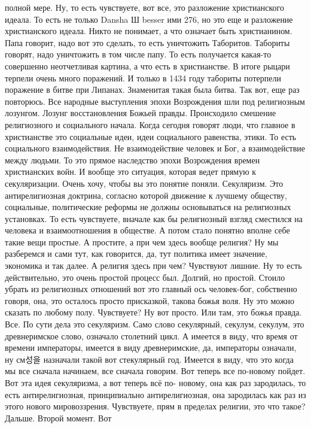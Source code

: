 полной мере. Ну, то есть чувствуете, вот все, это разложение христианского
идеала. То есть не только Dansha Ш besser ими 276, но это еще и разложение
христианского идеала. Никто не понимает, а что означает быть христианином. Папа
говорит, надо вот это сделать, то есть уничтожить Таборитов. Табориты говорят,
надо уничтожить в том числе папу. То есть получается какая-то совершенно
неотчетливая картина, а что есть в христианстве. В итоге рыцари терпели очень
много поражений. И только в 1434 году табориты потерпели поражение в битве при
Липанах. Знаменитая такая была битва. Так вот, еще раз повторюсь. Все народные
выступления эпохи Возрождения шли под религиозным лозунгом. Лозунг
восстановления Божьей правды. Происходило смешение религиозного и социального
начала. Когда сегодня говорят люди, что главное в христианстве это социальные
идеи, идеи социального равенства, этики. То есть социального взаимодействия. Не
взаимодействие человек и Бог, а взаимодействие между людьми. То это прямое
наследство эпохи Возрождения времен христианских войн. И вообще это ситуация,
которая ведет прямую к секуляризации. Очень хочу, чтобы вы это понятие поняли.
Секуляризм. Это антирелигиозная доктрина, согласно которой движение к лучшему
обществу, социальные, политические реформы не должны основываться на религиозных
установках. То есть чувствуете, вначале как бы религиозный взгляд сместился на
человека и взаимоотношения в обществе. А потом стало понятно вполне себе такие
вещи простые. А простите, а при чем здесь вообще религия? Ну мы разберемся и
сами тут, как говорится, да, тут политика имеет значение, экономика и так далее.
А религия здесь при чем? Чувствуют лишние. Ну то есть действительно, это очень
простой процесс был. Долгий, но простой. Стоило убрать из религиозных отношений
вот это главный ось человек-бог, собственно говоря, она, это осталось просто
присказкой, такова божья воля. Ну это можно сказать по любому полу. Чувствуете?
Ну вот просто. Или там, это божья правда. Все. По сути дела это секуляризм. Само
слово секулярный, секулум, секулум, это древнеримское слово, означало столетний
цикл. А имеется в виду, что время от времени императоры, имеется в виду
древнеримские, да, императоры означали, ну см성을 назначали такой вот стекулярный
год. Имеется в виду, что это когда мы все сначала начинаем, все сначала говорим.
Вот теперь все по-новому пойдет. Вот эта идея секуляризма, а вот теперь всё по-
новому, она как раз зародилась, то есть антирелигиозная, принципиально
антирелигиозная, она зародилась как раз из этого нового мировоззрения.
Чувствуете, прям в пределах религии, это что такое? Дальше. Второй момент. Вот
